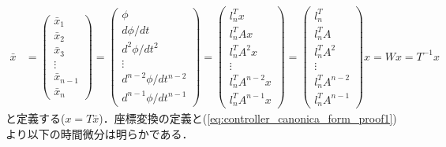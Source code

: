 \begin{align}
	\bar{x}
	& =
	\left(\begin{array}{c}
	     \bar{x}_1 \\
	     \bar{x}_2 \\
	     \bar{x}_3 \\
		 \vdots \\
	     \bar{x}_{n-1} \\
	     \bar{x}_n
	\end{array}\right)
	=
	\left(\begin{array}{c}
	     \phi \\
	     d \phi /dt \\
	     d^2 \phi /dt^2 \\
		 \vdots \\
	     d^{n-2} \phi /dt^{n-2} \\
	     d^{n-1} \phi /dt^{n-1}
	\end{array}\right)
	=
	\left(\begin{array}{c}
	     l_n^T x \\
	     l_n^T A x \\
	     l_n^T A^2 x \\
		 \vdots \\
	     l_n^T A^{n-2} x \\
	     l_n^T A^{n-1} x
	\end{array}\right)
	=
	\left(\begin{array}{c}
	     l_n^T  \\
	     l_n^T A  \\
	     l_n^T A^2  \\
		 \vdots \\
	     l_n^T A^{n-2}  \\
	     l_n^T A^{n-1} 
	\end{array}\right)
	x
	= Wx
	= T^{-1}x
\end{align}
と定義する($x = T \bar{x}$)．座標変換の定義と(\ref{eq:controller_canonica_form_proof1})より以下の時間微分は明らかである．
